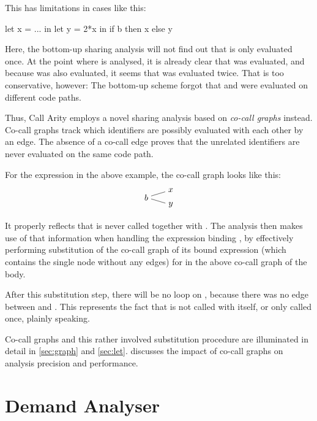This has limitations in cases like this:
\begin{haskellcode}
  let x = ...
  in let y = 2*x
     in if b
        then x
        else y
\end{haskellcode}

Here, the bottom-up sharing analysis will not find out that  is only evaluated once. 
At the point where  is analysed, it is already clear that  was evaluated, and because  was also evaluated, it seems that  was evaluated twice.
That is too conservative, however: The bottom-up scheme forgot that  and  were evaluated on different code paths.

Thus, Call Arity employs a novel sharing analysis based on \emph{co-call graphs} instead.
Co-call graphs track which identifiers are possibly evaluated with each other by an edge.
The absence of a co-call edge proves that the unrelated identifiers are never evaluated on the same code path.

For the  expression in the above example, the co-call graph looks like this:
\[  
  \begin{tikzpicture}[baseline={(0.base)}]
    \node (0) {$b$};
    \node at (1,0.3) (1) {$x$};
    \node at (1,-0.3) (2) {$y$};
    \draw (0) -- (1);
    \draw (0) -- (2);
  \end{tikzpicture}
\]

It properly reflects that  is never called together with .
The analysis then makes use of that information when handling the  expression binding , by effectively performing substitution of the co-call graph of its bound expression (which contains the single node  without any edges) for  in the above co-call graph of the body.

After this substitution step, there will be no loop on , because there was no edge between  and .
This represents the fact that  is not called with itself, or only called once, plainly speaking.

Co-call graphs and this rather involved substitution procedure are illuminated in detail in \cref{sec:graph} and \cref{sec:let}.
 discusses the impact of co-call graphs on analysis precision and performance.

\section{Demand Analyser}\label{sec:dmd}

